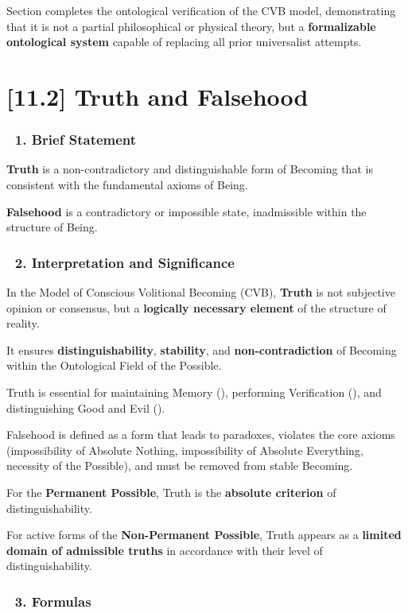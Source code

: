 \documentclass[12pt]{article}
\begin{document}
Section \text{[11.1.1.5]} completes the ontological verification of the CVB model, demonstrating that it is not a partial philosophical or physical theory, but a \textbf{formalizable ontological system} capable of replacing all prior universalist attempts.

\section*{[11.2] Truth and Falsehood}

\subsubsection*{🔹 1. Brief Statement}

\textbf{Truth} is a non-contradictory and distinguishable form of Becoming that is consistent with the fundamental axioms of Being.

\textbf{Falsehood} is a contradictory or impossible state, inadmissible within the structure of Being.

\subsubsection*{🔹 2. Interpretation and Significance}

In the Model of Conscious Volitional Becoming (CVB), \textbf{Truth} is not subjective opinion or consensus, but a \textbf{logically necessary element} of the structure of reality.

It ensures \textbf{distinguishability}, \textbf{stability}, and \textbf{non-contradiction} of Becoming within the Ontological Field of the Possible.

Truth is essential for maintaining Memory (\text{[10.3]}), performing Verification (\text{[11.6]}), and distinguishing Good and Evil (\text{[11.3]}).

Falsehood is defined as a form that leads to paradoxes, violates the core axioms (impossibility of Absolute Nothing, impossibility of Absolute Everything, necessity of the Possible), and must be removed from stable Becoming.

For the \textbf{Permanent Possible}, Truth is the \textbf{absolute criterion} of distinguishability.

For active forms of the \textbf{Non-Permanent Possible}, Truth appears as a \textbf{limited domain of admissible truths} in accordance with their level of distinguishability.

\subsubsection*{🔹 3. Formulas}
\end{document}
